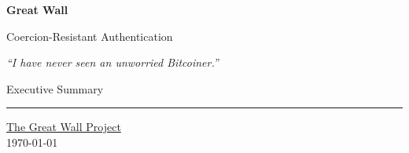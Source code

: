 
\thispagestyle{empty}
\begin{center}

\vspace*{3cm}

{\Huge\bfseries Great Wall}

\vspace{0.5cm}

{\Large Coercion-Resistant Authentication}

\vspace{1.5cm}

{\large\itshape ``I have never seen an unworried Bitcoiner.''}

\vspace{1.5cm}

{\large Executive Summary}

\vfill

\rule{0.6\textwidth}{0.4pt}

\vspace{1cm}

{\footnotesize
\href{https://loudproudandfree.com}{The Great Wall Project}\\[0.2cm]
\today
}

\end{center}

\clearpage
